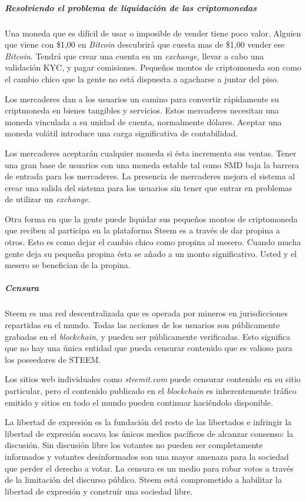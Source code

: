 \documentclass[a4paper,titlepage,final]{article}
\begin{document}
\subparagraph{Resolviendo el problema de liquidación de las criptomonedas}

Una moneda que es difícil de usar o imposible de vender tiene poco valor. Alguien que viene con \$1,00 en \textit{Bitcoin} descubrirá que cuesta mas de \$1,00 vender ese \textit{Bitcoin}. Tendrá que crear una cuenta en un \textit{exchange}, llevar a cabo una validación KYC, y pagar comisiones. Pequeños montos de criptomoneda son como el cambio chico que la gente no está dispuesta a agacharse a juntar del piso.

Los mercaderes dan a los usuarios un camino para convertir rápidamente su criptmoneda en bienes tangibles y servicios. Estos mercaderes necesitan una moneda vinculada a su unidad de cuenta, normalmente dólares. Aceptar una moneda volátil introduce una carga significativa de contabilidad.

Los mercaderes aceptarán cualquier moneda si ésta incrementa sus ventas. Tener una gran base de usuarios con una moneda estable tal como SMD baja la barrera de entrada para los mercaderes. La presencia de mercaderes mejora el sistema al crear una salida del sistema para los usuarios sin tener que entrar en problemas de utilizar un \textit{exchange}.

Otra forma en que la gente puede liquidar sus pequeños montos de criptomoneda que reciben al participa en la plataforma Steem es a través de dar propina a otros. Esto es como dejar el cambio chico como propina al mesero. Cuando mucha gente deja su pequeña propina ésta se añado a un monto significativo. Usted y el mesero se benefician de la propina.

\subparagraph{Censura}

Steem es una red descentralizada que es operada por mineros en jurisdicciones repartidas en el mundo. Todas las acciones de los usuarios son públicamente grabadas en el \textit{blockchain}, y pueden ser públicamente verificadas. Esto significa que no hay una única entidad que pueda censurar contenido que es valioso para los poseedores de STEEM.

Los sitios web individuales como \textit{steemit.com} puede censurar contenido en su sitio particular, pero el contenido publicado en el \textit{blockchain} es inherentemente tráfico emitido y sitios en todo el mundo pueden continuar haciéndolo disponible.

La libertad de expresión es la fundación del resto de las libertados e infringir la libertad de expresión socava los únicos medios pacíficos de alcanzar consenso: la discusión. Sin discusión libre los votantes no pueden ser completamente informados y votantes desinformados son una mayor amenaza para la sociedad que perder el derecho a votar. La censura es un medio para robar votos a través de la limitación del discurso público. Steem está comprometido a habilitar la libertad de expresión y construír una sociedad libre.
\end{document}
